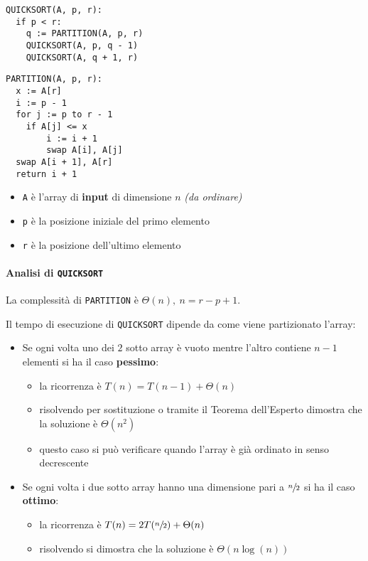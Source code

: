 \documentclass[italian, 10pt]{article}
\begin{document}
\begin{minipage}[t]{0.495\textwidth}
  \begin{lstlisting}[style=pseudocode, caption={Pseudocodice di \texttt{QUICKSORT}}, label={sec:algoritmo-quicksort}]
QUICKSORT(A, p, r):
  if p < r:
    q := PARTITION(A, p, r)
    QUICKSORT(A, p, q - 1)
    QUICKSORT(A, q + 1, r)
  \end{lstlisting}
\end{minipage}
\begin{minipage}[t]{0.495\textwidth}
  \begin{lstlisting}[style=pseudocode, caption={Pseudocodice di \texttt{PARTITION}}, label={sec:algoritmo-partition}]
PARTITION(A, p, r):
  x := A[r]
  i := p - 1
  for j := p to r - 1
    if A[j] <= x
        i := i + 1
        swap A[i], A[j]
  swap A[i + 1], A[r]
  return i + 1
  \end{lstlisting}
\end{minipage}

\begin{itemize}
  \item \texttt{A} è l'array di \textbf{input} di dimensione \(n\) \textit{(da ordinare)}
  \item \texttt{p} è la posizione iniziale del primo elemento
  \item \texttt{r} è la posizione dell'ultimo elemento
\end{itemize}

\paragraph{Analisi di \texttt{QUICKSORT}}

La complessità di \texttt{PARTITION} è \(\Theta(n),\ n = r - p + 1\).

\bigskip
Il tempo di esecuzione di \texttt{QUICKSORT} dipende da come viene partizionato l'array:

\begin{itemize}
  \item Se ogni volta uno dei \(2\) sotto array è vuoto mentre l'altro contiene \(n-1\) elementi si ha il caso \textbf{pessimo}:
        \begin{itemize}
          \item la ricorrenza è \(T(n) = T(n - 1) + \Theta(n)\)
          \item risolvendo per sostituzione o tramite il Teorema dell'Esperto dimostra che la soluzione è \(\Theta(n^2)\)
          \item questo caso si può verificare quando l'array è già ordinato in senso decrescente
        \end{itemize}
  \item Se ogni volta i due sotto array hanno una dimensione pari a \(\sfrac{n}{2}\) si ha il caso \textbf{ottimo}:
        \begin{itemize}
          \item la ricorrenza è \(T(n) = 2T(\sfrac{n}{2}) + \Theta(n)\)
          \item risolvendo si dimostra che la soluzione è \(\Theta(n \log{(n)})\)
        \end{itemize}
\end{itemize}
\end{document}
